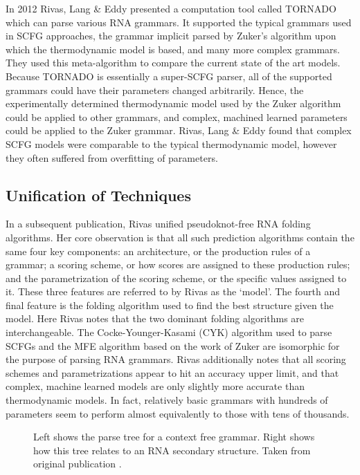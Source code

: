 \documentclass[12pt, a4paper]{article}
\begin{document}
In 2012 Rivas, Lang \& Eddy \cite{rivas2012range} presented a computation tool called TORNADO which can parse various RNA grammars. It supported the typical grammars used in SCFG approaches, the grammar implicit parsed by Zuker's algorithm upon which the thermodynamic model is based, and many more complex grammars. They used this meta-algorithm to compare the current state of the art models. Because TORNADO is essentially a super-SCFG parser, all of the supported grammars could have their parameters changed arbitrarily. Hence, the experimentally determined thermodynamic model used by the Zuker algorithm could be applied to other grammars, and complex, machined learned parameters could be applied to the Zuker grammar. Rivas, Lang \& Eddy found that complex SCFG models were comparable to the typical thermodynamic model, however they often suffered from overfitting of parameters.

\subsection{Unification of Techniques}

In a subsequent publication, Rivas \cite{rivas2013four} unified pseudoknot-free RNA folding algorithms. Her core observation is that all such prediction algorithms contain the same four key components: an architecture, or the production rules of a grammar; a scoring scheme, or how scores are assigned to these production rules; and the parametrization of the scoring scheme, or the specific values assigned to it. These three features are referred to by Rivas as the `model'. The fourth and final feature is the folding algorithm used to find the best structure given the model. Here Rivas notes that the two dominant folding algorithms are interchangeable. The Cocke-Younger-Kasami (CYK) algorithm used to parse SCFGs and the MFE algorithm based on the work of Zuker are isomorphic for the purpose of parsing RNA grammars. Rivas additionally notes that all scoring schemes and parametrizations appear to hit an accuracy upper limit, and that complex, machine learned models are only slightly more accurate than thermodynamic models. In fact, relatively basic grammars with hundreds of parameters seem to perform almost equivalently to those with tens of thousands.

\begin{figure}
\begin{center}
\end{center}
\caption{Left shows the parse tree for a context free grammar. Right shows how this tree relates to an RNA secondary structure. Taken from original publication \cite{sakakibara1994stochastic}.}
\label{fig:scfg}
\end{figure}
\end{document}
